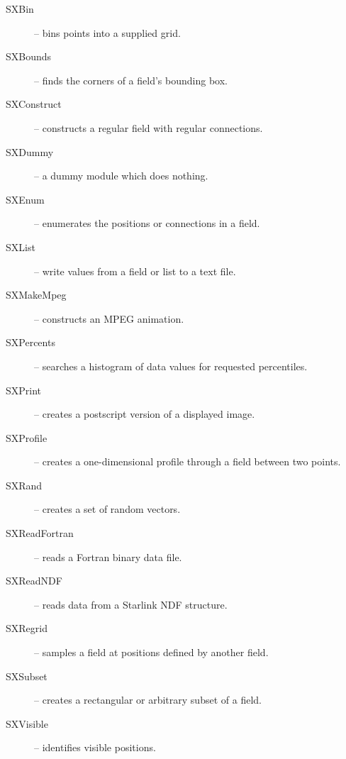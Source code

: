 \begin{description}

  \item[SXBin] -- bins points into a supplied grid.

  \item[SXBounds] -- finds the corners of a field's bounding box.

  \item[SXConstruct] -- constructs a regular field with regular
   connections.

  \item[SXDummy] -- a dummy module which does nothing.

  \item[SXEnum] -- enumerates the positions or connections in a field.

  \item[SXList] -- write values from a field or list to a text file.

  \item[SXMakeMpeg] -- constructs an MPEG animation.

  \item[SXPercents] -- searches a histogram of data values for requested
   percentiles.

  \item[SXPrint] -- creates a postscript version of a displayed image.

  \item[SXProfile] -- creates a one-dimensional profile through a field 
   between two points.

  \item[SXRand] -- creates a set of random vectors.

  \item[SXReadFortran] -- reads a Fortran binary data file.

  \item[SXReadNDF] -- reads data from a Starlink NDF structure.

  \item[SXRegrid] -- samples a field at positions defined by another
   field.

  \item[SXSubset] -- creates a rectangular or arbitrary subset of a field.

  \item[SXVisible] -- identifies visible positions.


\end{description}

